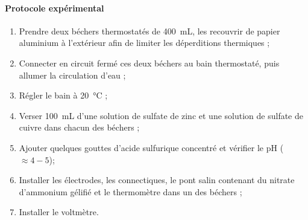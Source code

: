 \documentclass[twoside,a4paper,11pt,addpoints]{exam}%
\begin{document}
\paragraph*{Protocole expérimental}
\begin{enumerate}
\item Prendre deux béchers thermostatés de \SI{400}{\milli\liter}, les recouvrir de papier aluminium à l'extérieur afin de limiter les déperditions thermiques ;
\item Connecter en circuit fermé ces deux béchers au bain thermostaté, puis allumer la circulation d'eau ;
\item Régler le bain à \SI{20}{\celsius} ;
\item Verser \SI{100}{\milli\liter} d'une solution de sulfate de zinc et une solution de sulfate de cuivre dans chacun des béchers ;
\item Ajouter quelques gouttes d'acide sulfurique concentré et vérifier le pH ($\approx 4-5$);
\item Installer les électrodes, les connectiques, le pont salin contenant du nitrate d'ammonium  gélifié et le thermomètre dans un des béchers ;
\item Installer le voltmètre.
\end{enumerate}

\hspace{0.5cm}
\end{document}
